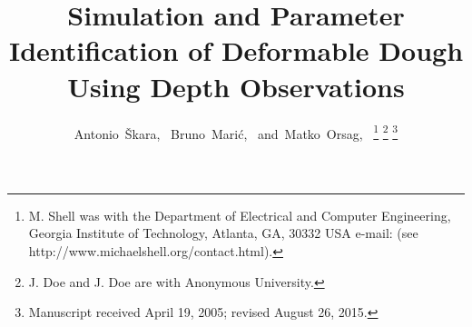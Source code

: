\documentclass[journal]{IEEEtran}
\begin{document}
%
\title{Simulation and Parameter Identification of Deformable Dough Using Depth Observations}
%
%
%

\author{Antonio~Škara,~
        Bruno~Marić,~
        and~Matko~Orsag,~%
\thanks{M. Shell was with the Department
of Electrical and Computer Engineering, Georgia Institute of Technology, Atlanta,
GA, 30332 USA e-mail: (see http://www.michaelshell.org/contact.html).}%
\thanks{J. Doe and J. Doe are with Anonymous University.}%
\thanks{Manuscript received April 19, 2005; revised August 26, 2015.}}

% 
%
\end{document}
